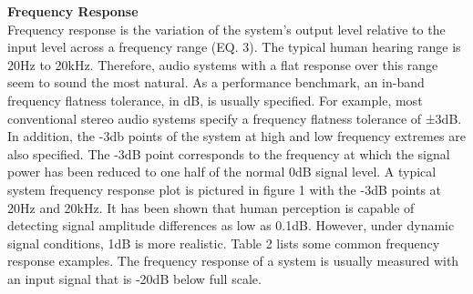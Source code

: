 \textbf{Frequency Response}\\
Frequency response is the variation of the system’s output level relative to the input level across a frequency range (EQ. 3). The typical human hearing range is 20Hz to 20kHz. Therefore, audio systems with a flat response over this range seem to sound the most natural. As a performance benchmark, an in-band frequency flatness tolerance, in dB, is usually specified. For example, most conventional stereo audio systems specify a frequency flatness tolerance of ±3dB. In addition, the -3db points of the system at high and low frequency extremes are also specified. The -3dB point corresponds to the frequency at which the signal power has been reduced to one half of the normal 0dB signal level. A typical system frequency response plot is pictured in figure 1 with the -3dB points at 20Hz and 20kHz. It has been shown that human perception is capable of detecting signal amplitude differences as low as 0.1dB. However, under dynamic signal conditions, 1dB is more realistic. Table 2 lists some common frequency response examples. The frequency response of a system is usually measured with an input signal that is -20dB below full scale.\\

